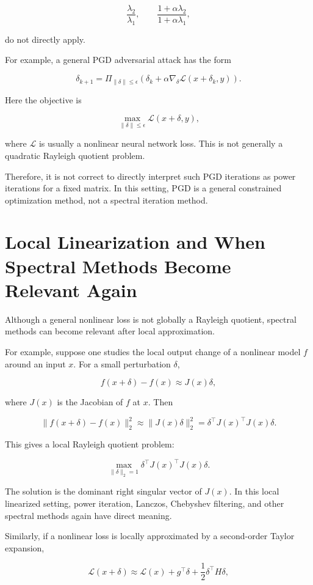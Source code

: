 \documentclass{article}
\begin{document}
\[
\frac{\lambda_2}{\lambda_1},
\qquad
\frac{1+\alpha\lambda_2}{1+\alpha\lambda_1},
\]

do not directly apply.

For example, a general PGD adversarial attack has the form

\[
\delta_{k+1}
=
\Pi_{\|\delta\|\le \epsilon}
\left(
\delta_k+\alpha\nabla_\delta \mathcal{L}(x+\delta_k,y)
\right).
\]

Here the objective is

\[
\max_{\|\delta\|\le\epsilon}
\mathcal{L}(x+\delta,y),
\]

where \(\mathcal{L}\) is usually a nonlinear neural network loss. This is not generally a quadratic Rayleigh quotient problem.

Therefore, it is not correct to directly interpret such PGD iterations as power iterations for a fixed matrix. In this setting, PGD is a general constrained optimization method, not a spectral iteration method.

\section{Local Linearization and When Spectral Methods Become Relevant Again}

Although a general nonlinear loss is not globally a Rayleigh quotient, spectral methods can become relevant after local approximation.

For example, suppose one studies the local output change of a nonlinear model \(f\) around an input \(x\). For a small perturbation \(\delta\),

\[
f(x+\delta)-f(x)
\approx
J(x)\delta,
\]

where \(J(x)\) is the Jacobian of \(f\) at \(x\). Then

\[
\|f(x+\delta)-f(x)\|_2^2
\approx
\|J(x)\delta\|_2^2
=
\delta^\top J(x)^\top J(x)\delta.
\]

This gives a local Rayleigh quotient problem:

\[
\max_{\|\delta\|_2=1}
\delta^\top J(x)^\top J(x)\delta.
\]

The solution is the dominant right singular vector of \(J(x)\). In this local linearized setting, power iteration, Lanczos, Chebyshev filtering, and other spectral methods again have direct meaning.

Similarly, if a nonlinear loss is locally approximated by a second-order Taylor expansion,

\[
\mathcal{L}(x+\delta)
\approx
\mathcal{L}(x)
+
g^\top \delta
+
\frac{1}{2}\delta^\top H\delta,
\]
\end{document}
